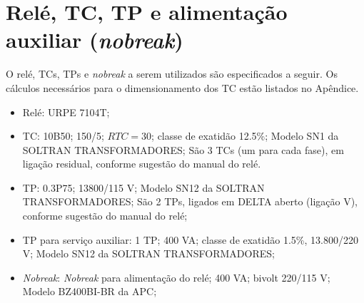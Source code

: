 \section{Relé, TC, TP e alimentação auxiliar (\textit{nobreak})}

O relé, TCs, TPs e \textit{nobreak} a serem utilizados são especificados a seguir. Os cálculos necessários para o dimensionamento dos TC estão listados no Apêndice.

\begin{itemize}
    \item Relé: URPE 7104T;
    \item TC: 10B50; 150/5; $RTC=30$; classe de exatidão 12.5\%; Modelo SN1 da SOLTRAN TRANSFORMADORES; São 3 TCs (um para cada fase), em ligação residual, conforme sugestão do manual do relé.
    \item TP: 0.3P75; 13800/115 V; Modelo SN12 da SOLTRAN TRANSFORMADORES; São 2 TPs, ligados em DELTA aberto (ligação V), conforme sugestão do manual do relé;
    \item TP para serviço auxiliar: 1 TP; 400 VA; classe de exatidão 1.5\%, 13.800/220 V; Modelo SN12 da SOLTRAN TRANSFORMADORES;
    \item \textit{Nobreak}: \textit{Nobreak} para alimentação do relé; 400 VA; bivolt 220/115 V; Modelo BZ400BI-BR da APC; %
\end{itemize}